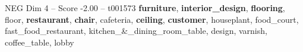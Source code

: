 \begin{textsample}{NEG Dim 4 – Score -2.00 – t001573}  \label{ex:f4_neg_009}
\textbf{furniture}, \textbf{interior\_design}, \textbf{flooring}, floor, \textbf{restaurant}, \textbf{chair}, cafeteria, \textbf{ceiling}, \textbf{customer}, houseplant, food\_court, fast\_food\_restaurant, kitchen\_\&\_dining\_room\_table, design, varnish, coffee\_table, lobby

\end{textsample}
